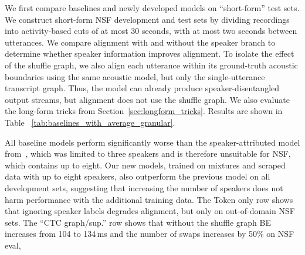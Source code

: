 We first compare baselines and newly developed models on ``short-form'' test sets. We construct short-form NSF development and test sets by dividing recordings into activity-based cuts of at most 30 seconds, with at most two seconds between utterances. We compare alignment with and without the speaker branch to determine whether speaker information improves alignment. To isolate the effect of the shuffle graph, we also align each utterance within its ground-truth acoustic boundaries using the same acoustic model, but only the single-utterance transcript graph. Thus, the model can already produce speaker-disentangled output streams, but alignment does not use the shuffle graph. We also evaluate the long-form tricks from Section~\ref{sec:longform_tricks}. Results are shown in Table ~\ref{tab:baselines_with_average_granular}.

All baseline models perform significantly worse than the speaker-attributed model from~\cite{wiesner2026modeling}, which was limited to three speakers and is therefore unsuitable for NSF, which contains up to eight. Our new models, trained on mixtures and scraped data with up to eight speakers, also outperform the previous model on all development sets, suggesting that increasing the number of speakers does not harm performance with the additional training data. The Token only row shows that ignoring speaker labels degrades alignment, but only on out-of-domain NSF sets. The ``CTC graph/sup.'' row shows that without the shuffle graph BE increases from 104 to 134\,ms and the number of swaps increases by 50\% on NSF eval, 


